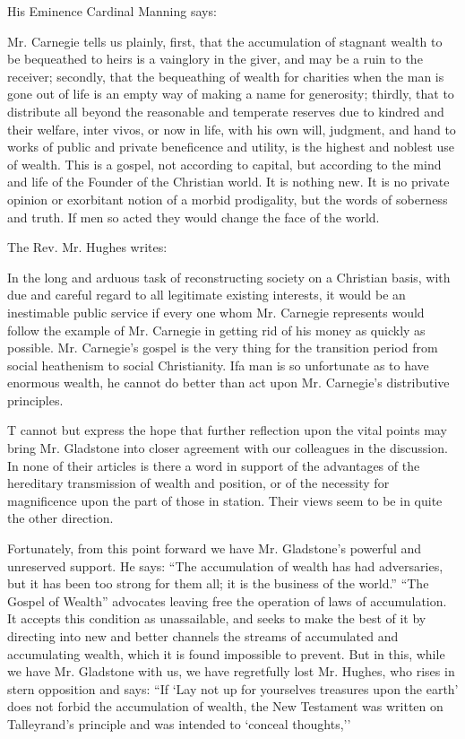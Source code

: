 \documentclass[11pt,openany]{book}
\begin{document}
His Eminence Cardinal Manning says:

Mr. Carnegie tells us plainly, first, that the accumulation of stagnant wealth to be bequeathed to heirs is a vainglory in the giver, and may be a ruin to the receiver; secondly, that the bequeathing of wealth for charities when the man is gone out of life is an empty way of making a name for generosity; thirdly, that to distribute all beyond the reasonable and temperate reserves due to kindred and their welfare, inter vivos, or now in life, with his own will, judgment, and hand to works of public and private beneficence and utility, is the highest and noblest use of wealth. This is a gospel, not according to capital, but according to the mind and life of the Founder of the Christian world. It is nothing new. It is no private opinion or exorbitant notion of a morbid prodigality, but the words of soberness and truth. If men so acted they would change the face of the world.

The Rev. Mr. Hughes writes:

In the long and arduous task of reconstructing society on a Christian basis, with due and careful regard to all legitimate existing interests, it would be an inestimable public service if every one whom Mr. Carnegie represents would follow the example of Mr. Carnegie in getting rid of his money as quickly as possible. Mr. Carnegie's gospel is the very thing for the transition period from social heathenism to social Christianity. Ifa man is so unfortunate as to have enormous wealth, he cannot do better than act upon Mr. Carnegie's distributive principles.

T cannot but express the hope that further reflection upon the vital points may bring Mr. Gladstone into closer agreement with our colleagues in the discussion. In none of their articles is there a word in support of the advantages of the hereditary transmission of wealth and position, or of the necessity for magnificence upon the part of those in station. Their views seem to be in quite the other direction.

Fortunately, from this point forward we have Mr. Gladstone's powerful and unreserved support. He says: ``The accumulation of wealth has had adversaries, but it has been too strong for them all; it is the business of the world.'' ``The Gospel of Wealth'' advocates leaving free the operation of laws of accumulation. It accepts this condition as unassailable, and seeks to make the best of it by directing into new and better channels the streams of accumulated and accumulating wealth, which it is found impossible to prevent. But in this, while we have Mr. Gladstone with us, we have regretfully lost Mr. Hughes, who rises in stern opposition and says: ``If `Lay not up for yourselves treasures upon the earth' does not forbid the accumulation of wealth, the New Testament was written on Talleyrand's principle and was intended to `conceal thoughts,''
\end{document}
